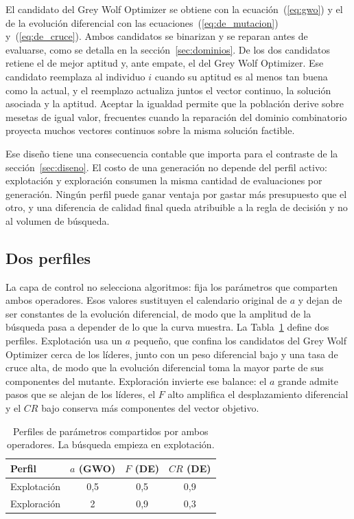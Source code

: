 \documentclass[runningheads]{llncs}
\begin{document}
El candidato del Grey Wolf Optimizer se obtiene con la ecuación~(\ref{eq:gwo}) y el de la evolución diferencial con las ecuaciones~(\ref{eq:de_mutacion}) y~(\ref{eq:de_cruce}). Ambos candidatos se binarizan y se reparan antes de evaluarse, como se detalla en la sección~\ref{sec:dominios}. De los dos candidatos retiene el de mejor aptitud y, ante empate, el del Grey Wolf Optimizer. Ese candidato reemplaza al individuo $i$ cuando su aptitud es al menos tan buena como la actual, y el reemplazo actualiza juntos el vector continuo, la solución asociada y la aptitud. Aceptar la igualdad permite que la población derive sobre mesetas de igual valor, frecuentes cuando la reparación del dominio combinatorio proyecta muchos vectores continuos sobre la misma solución factible.

Ese diseño tiene una consecuencia contable que importa para el contraste de la sección~\ref{sec:diseno}. El costo de una generación no depende del perfil activo: explotación y exploración consumen la misma cantidad de evaluaciones por generación. Ningún perfil puede ganar ventaja por gastar más presupuesto que el otro, y una diferencia de calidad final queda atribuible a la regla de decisión y no al volumen de búsqueda.

\subsection{Dos perfiles}
\label{sec:perfiles}

La capa de control no selecciona algoritmos: fija los parámetros que comparten ambos operadores. Esos valores sustituyen el calendario original de $a$ y dejan de ser constantes de la evolución diferencial, de modo que la amplitud de la búsqueda pasa a depender de lo que la curva muestra. La Tabla~\ref{tab:perfiles} define dos perfiles. Explotación usa un $a$ pequeño, que confina los candidatos del Grey Wolf Optimizer cerca de los líderes, junto con un peso diferencial bajo y una tasa de cruce alta, de modo que la evolución diferencial toma la mayor parte de sus componentes del mutante. Exploración invierte ese balance: el $a$ grande admite pasos que se alejan de los líderes, el $F$ alto amplifica el desplazamiento diferencial y el $CR$ bajo conserva más componentes del vector objetivo.

\begin{table}
\caption{Perfiles de parámetros compartidos por ambos operadores. La búsqueda empieza en explotación.}
\label{tab:perfiles}
\begin{tabular}{lccc}
\toprule
Perfil & $a$ (GWO) & $F$ (DE) & $CR$ (DE) \\
\midrule
Explotación & 0,5 & 0,5 & 0,9 \\
Exploración & 2 & 0,9 & 0,3 \\
\bottomrule
\end{tabular}
\end{table}
\end{document}
